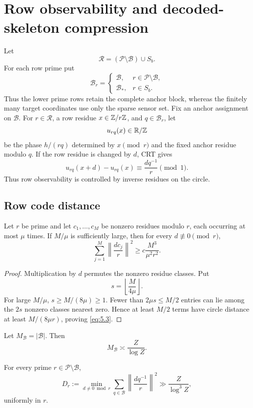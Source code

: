 \section{Row observability and decoded-skeleton compression}\label{sec:rows}

Let
\[
\mathcal R=(\mathcal P\setminus\mathcal B)\cup S_b.
\tag{5.1}\label{eq:5.1}
\]
For each row prime put
\[
\mathcal B_r=
\begin{cases}
\mathcal B,&r\in\mathcal P\setminus\mathcal B,\\
\mathcal B_*,&r\in S_b.
\end{cases}
\]
Thus the lower prime rows retain the complete anchor block, whereas the finitely many target coordinates use only the sparse sensor set. Fix an anchor assignment on $\mathcal B$. For $r\in\mathcal R$, a row residue $x\in\mathbb Z/r\mathbb Z$, and $q\in\mathcal B_r$, let
\[
u_{rq}(x)\in\mathbb R/\mathbb Z
\]
be the phase $h/(rq)$ determined by $x\pmod r$ and the fixed anchor residue modulo $q$. If the row residue is changed by $d$, CRT gives
\[
u_{rq}(x+d)-u_{rq}(x)
\equiv\frac{dq^{-1}}r\pmod1.
\tag{5.2}\label{eq:5.2}
\]
Thus row observability is controlled by inverse residues on the circle.

\subsection{Row code distance}

\begin{lemma}\label{lem:cyclic-energy}
Let $r$ be prime and let $c_1,\ldots,c_M$ be nonzero residues modulo $r$, each occurring at most $\mu$ times. If $M/\mu$ is sufficiently large, then for every $d\not\equiv0\pmod r$,
\[
\sum_{j=1}^M
\left\|\frac{dc_j}{r}\right\|^2
\ge
c\frac{M^3}{\mu^2r^2}.
\tag{5.3}\label{eq:5.3}
\]
\end{lemma}

\begin{proof}
Multiplication by $d$ permutes the nonzero residue classes. Put
\[
s=\left\lfloor\frac{M}{4\mu}\right\rfloor.
\]
For large $M/\mu$, $s\ge M/(8\mu)\ge1$. Fewer than $2\mu s\le M/2$ entries can lie among the $2s$ nonzero classes nearest zero. Hence at least $M/2$ terms have circle distance at least $M/(8\mu r)$, proving \eqref{eq:5.3}.
\end{proof}

Let $M_{\mathcal B}=|\mathcal B|$. Then
\[
M_{\mathcal B}\asymp\frac{Z}{\log Z}.
\tag{5.4}\label{eq:5.4}
\]

\begin{proposition}\label{prop:lower-row-distance}
For every prime $r\in\mathcal P\setminus\mathcal B$,
\[
D_r:=
\min_{d\ne0\bmod r}
\sum_{q\in\mathcal B}
\left\|\frac{dq^{-1}}r\right\|^2
\gg\frac{Z}{\log^3Z},
\tag{5.5}\label{eq:5.5}
\]
uniformly in $r$.
\end{proposition}

